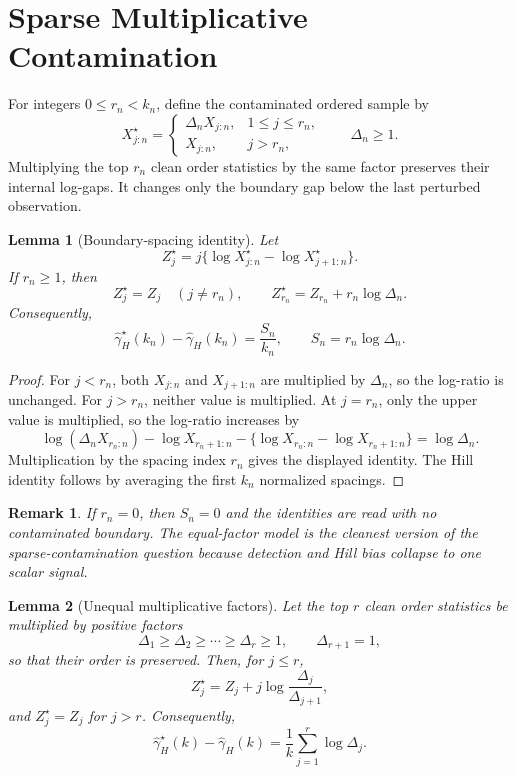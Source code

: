 \documentclass[11pt]{article}
\newtheorem{lemma}{Lemma}
\newtheorem{remark}{Remark}
\newcommand{\ghat}{\widehat{\gamma}}
\begin{document}
\section{Sparse Multiplicative Contamination}

For integers $0\le r_n<k_n$, define the contaminated ordered sample by
\[
  X^\star_{j:n}
  =
  \begin{cases}
    \Delta_n X_{j:n}, & 1\le j\le r_n,\\
    X_{j:n}, & j>r_n,
  \end{cases}
  \qquad \Delta_n\ge1.
\]
Multiplying the top $r_n$ clean order statistics by the same factor preserves
their internal log-gaps.  It changes only the boundary gap below the last
perturbed observation.

\begin{lemma}[Boundary-spacing identity]
\label{lem:boundary}
Let
\[
  Z^\star_j
  =
  j\{\log X^\star_{j:n}-\log X^\star_{j+1:n}\}.
\]
If $r_n\ge1$, then
\[
  Z^\star_j=Z_j\quad(j\ne r_n),
  \qquad
  Z^\star_{r_n}=Z_{r_n}+r_n\log\Delta_n.
\]
Consequently,
\[
  \ghat^\star_H(k_n)-\ghat_H(k_n)
  =
  \frac{S_n}{k_n},
  \qquad
  S_n=r_n\log\Delta_n.
\]
\end{lemma}

\begin{proof}
For $j<r_n$, both $X_{j:n}$ and $X_{j+1:n}$ are multiplied by $\Delta_n$, so the
log-ratio is unchanged.  For $j>r_n$, neither value is multiplied.  At
$j=r_n$, only the upper value is multiplied, so the log-ratio increases by
\[
  \log(\Delta_n X_{r_n:n})-\log X_{r_n+1:n}
  -
  \{\log X_{r_n:n}-\log X_{r_n+1:n}\}
  =
  \log\Delta_n.
\]
Multiplication by the spacing index $r_n$ gives the displayed identity.  The
Hill identity follows by averaging the first $k_n$ normalized spacings.
\end{proof}

\begin{remark}
If $r_n=0$, then $S_n=0$ and the identities are read with no contaminated
boundary.  The equal-factor model is the cleanest version of the
sparse-contamination question because detection and Hill bias collapse to one
scalar signal.
\end{remark}

\begin{lemma}[Unequal multiplicative factors]
\label{lem:unequal}
Let the top $r$ clean order statistics be multiplied by positive factors
\[
  \Delta_1\ge\Delta_2\ge\cdots\ge\Delta_r\ge1,
  \qquad
  \Delta_{r+1}=1,
\]
so that their order is preserved.  Then, for $j\le r$,
\[
  Z_j^\star
  =
  Z_j+j\log\frac{\Delta_j}{\Delta_{j+1}},
\]
and $Z_j^\star=Z_j$ for $j>r$.  Consequently,
\[
  \ghat_H^\star(k)-\ghat_H(k)
  =
  \frac1k\sum_{j=1}^{r}\log\Delta_j .
\]
\end{lemma}
\end{document}

